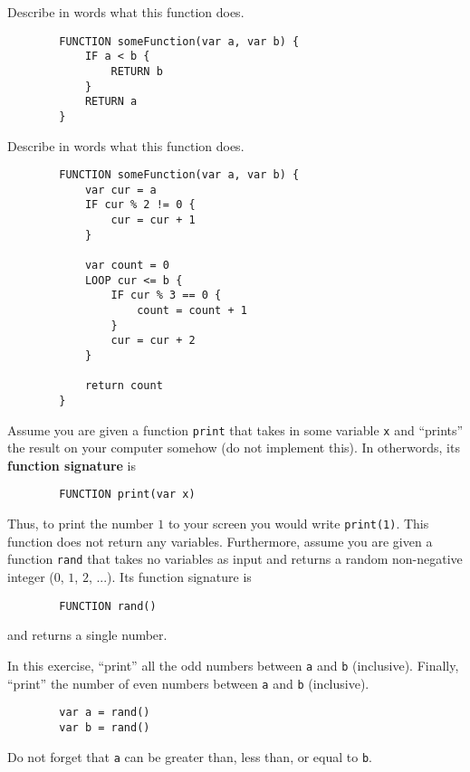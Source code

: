 \documentclass{article}
\begin{document}
\begin{Exercise}

    Describe in words what this function does.

    \begin{lstlisting}
        FUNCTION someFunction(var a, var b) {
            IF a < b {
                RETURN b
            }
            RETURN a
        }
    \end{lstlisting}

\end{Exercise}

\begin{Exercise}

    Describe in words what this function does.

    \begin{lstlisting}
        FUNCTION someFunction(var a, var b) {
            var cur = a
            IF cur % 2 != 0 {
                cur = cur + 1
            }

            var count = 0
            LOOP cur <= b {
                IF cur % 3 == 0 {
                    count = count + 1
                }
                cur = cur + 2
            }

            return count
        }
    \end{lstlisting}

\end{Exercise}

\begin{Exercise}

    Assume you are given a function \lstinline{print} that takes in some variable \lstinline{x} and ``prints'' the result on your computer somehow (do not implement this).
    In otherwords, its \textbf{function signature} is
    \begin{lstlisting}
        FUNCTION print(var x)
    \end{lstlisting}
    Thus, to print the number $1$ to your screen you would write \lstinline{print(1)}.
    This function does not return any variables.
    Furthermore, assume you are given a function \lstinline{rand} that takes no variables as input and returns a random non-negative integer ($0$, $1$, $2$, ...).
    Its function signature is 
    \begin{lstlisting}
        FUNCTION rand()
    \end{lstlisting}
    and returns a single number.

    In this exercise, ``print'' all the odd numbers between \lstinline{a} and \lstinline{b} (inclusive).
    Finally, ``print'' the number of even numbers between \lstinline{a} and \lstinline{b} (inclusive).
    \begin{lstlisting}
        var a = rand()
        var b = rand()
    \end{lstlisting}

    Do not forget that \lstinline{a} can be greater than, less than, or equal to \lstinline{b}.

\end{Exercise}
\end{document}
